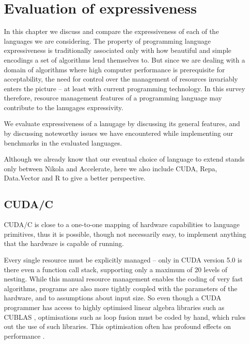 \chapter{Evaluation of expressiveness}
\label{chap:expressiveness}

In this chapter we discuss and compare the expressiveness of each of the
languages we are considering.  The property of programming language
expressiveness is traditionally associated only with how beautiful and simple
encodings a set of algorithms lend themselves to. But since we are dealing with
a domain of algorithms where high computer performance is prerequisite for
acceptability, the need for control over the management of resources invariably
enters the picture -- at least with current programming technology. In this
survey therefore, resource management features of a programming language may
contribute to the lanugages expressivity.

We evaluate expressiveness of a lanugage by discussing its general features,
and by discussing noteworthy issues we have encountered while implementing our
benchmarks in the evaluated languages.

Although we already know that our eventual choice of language to extend stands
only between Nikola and Accelerate, here we also include CUDA, Repa,
Data.Vector and R to give a better perspective.

\section{CUDA/C}
CUDA/C is close to a one-to-one mapping of hardware capabilities to language
primitives, thus it is possible, though not necessarily easy, to implement anything
that the hardware is capable of running.

Every single resource must be explicitly managed -- only in CUDA version 5.0 is
there even a function call stack, supporting only a maximum of 20 levels of
nesting.  While this manual resource management enables the coding of very fast
algorithms, programs are also more tightly coupled with the parameters of the
hardware, and to assumptions about input size. So even though a CUDA programmer
has access to highly optimised linear algebra libraries such as CUBLAS
\cite{CUBLAS2013}, optimisations such as loop fusion must be coded by hand,
which rules out the use of such libraries. This optimisation often has profound
effects on performance \cite{mainlandhaskell}.

